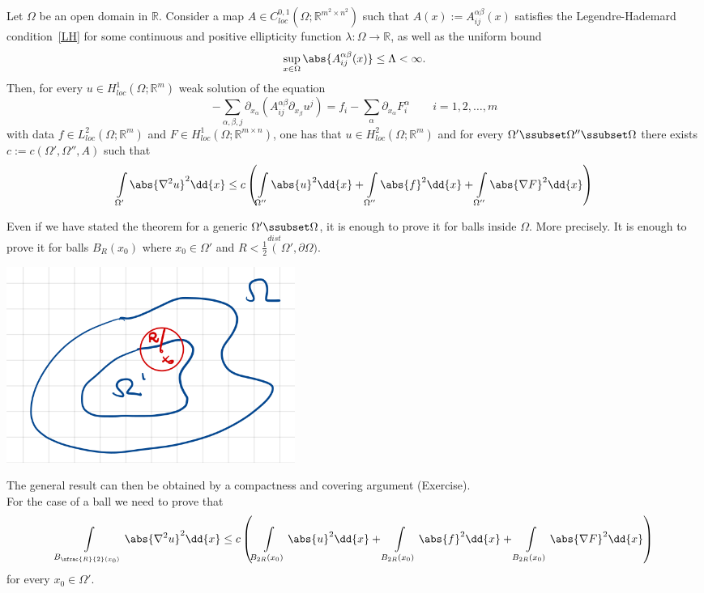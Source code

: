 \begin{thm}[\(H^{2}\)-regularity]
	Let \( \Omega  \) be an open domain in \( \mathbb{R} \). Consider a map \( A\in C_{loc}^{0,1}(\Omega ; \mathbb{R}^{m^{2}\times n^{2}})  \)
	such that \( A(x) := A_{ij}^{\alpha \beta }(x)\) satisfies the Legendre-Hademard condition~\eqref{LH} for some continuous and positive ellipticity function \( \lambda : \Omega \to \mathbb{R}\),
	as well as the uniform bound
	\[ \sup_{x \in \Omega } \abs{A_{ij}^{\alpha \beta }(x)}\leq \Lambda < \infty. \] Then,
	for every \( u \in H_{loc}^{1}(\Omega ; \mathbb{R}^{m})  \) weak solution of the equation \[ - \sum\limits_{\alpha ,\beta ,j}^{}\partial_{x_{\alpha }}(A_{ij}^{\alpha \beta }\partial_{x_{\beta}}u^{j}) = f_{i}-\sum\limits_{\alpha}^{} \partial_{x_{\alpha }}F_{i}^{\alpha } \qquad i=1,2,\ldots,m  \]
	with data \( f \in L_{loc}^{2}(\Omega ;\mathbb{R}^{m}) \) and \( F \in H_{loc}^{1}(\Omega ;\mathbb{R}^{m \times n})  \), one  has that \( u \in H_{loc}^{2}(\Omega ; \mathbb{R}^{m})  \) and for every \( \Omega' \ssubset \Omega'' \ssubset \Omega \) there exists \( c:=c(\Omega', \Omega'', A)  \) such that
	\[ \int\limits_{\Omega'}^{} \abs{\nabla ^{2}u}^{2} \dd{x} \leq c \left( \int\limits_{\Omega''}^{} \abs{u}^{2} \dd{x} + \int\limits_{\Omega''}^{} \abs{f}^{2} \dd{x} + \int\limits_{\Omega''}^{} \abs{\nabla F}^{2} \dd{x} \right) \]
\end{thm}

\begin{remark}[]
	Even if we have stated the theorem for a generic \( \Omega' \ssubset \Omega  \), it is enough to prove it for balls inside \( \Omega  \).
	More precisely. It is enough to prove it for balls \( B_{R}(x_{0}) \) where \( x_{0}\in \Omega' \) and \( R < \frac{1}{2}\overset{dist}(\Omega', \partial \Omega )  \).
	\begin{center}
		\includegraphics[scale=0.45]{pictures/picture02.png}
	\end{center}
	The general result can then be obtained by a compactness and covering argument (Exercise).\\
	For the case of a ball we need to prove that
	\[ \int\limits_{B_{\sfrac{R}{2}(x_{0}) }}^{} \abs{\nabla ^{2}u}^{2} \dd{x} \leq c \left( \int\limits_{B_{2R}(x_{0})}^{} \abs{u}^{2} \dd{x} + \int\limits_{B_{2R}(x_{0})}^{} \abs{f}^{2} \dd{x} + \int\limits_{B_{2R}(x_{0})}^{} \abs{\nabla F}^{2} \dd{x} \right) \] for every \( x_{0} \in \Omega' \).
\end{remark}

